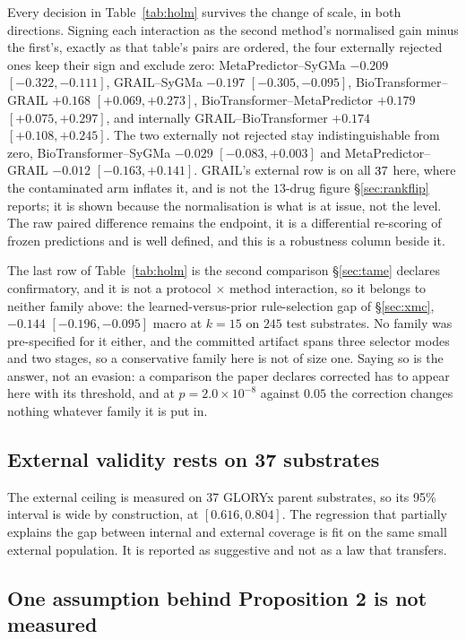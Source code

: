 Every decision in Table~\ref{tab:holm} survives the change of scale, in both directions. Signing each
interaction as the second method's normalised gain minus the first's, exactly as that table's pairs
are ordered, the four externally rejected ones keep their sign and exclude zero:
MetaPredictor--SyGMa $-0.209$ $[-0.322,-0.111]$, GRAIL--SyGMa $-0.197$ $[-0.305,-0.095]$,
BioTransformer--GRAIL $+0.168$ $[+0.069,+0.273]$, BioTransformer--MetaPredictor $+0.179$
$[+0.075,+0.297]$, and internally GRAIL--BioTransformer $+0.174$ $[+0.108,+0.245]$. The two
externally not rejected stay indistinguishable from zero, BioTransformer--SyGMa $-0.029$
$[-0.083,+0.003]$ and MetaPredictor--GRAIL $-0.012$ $[-0.163,+0.141]$. GRAIL's external row
is on all $37$ here, where the contaminated arm inflates it, and is not the $13$-drug figure
\S\ref{sec:rankflip} reports; it is shown because the normalisation is what is at issue, not the
level. The raw paired difference remains the endpoint, it is a differential re-scoring of frozen
predictions and is well defined, and this is a robustness column beside it.

The last row of Table~\ref{tab:holm} is the second comparison \S\ref{sec:tame} declares confirmatory, and it is not a
protocol $\times$ method interaction, so it belongs to neither family above: the learned-versus-prior
rule-selection gap of \S\ref{sec:xmc}, $-0.144$ $[-0.196,-0.095]$ macro at $k=15$ on $245$ test
substrates. No family was pre-specified for it either, and the
committed artifact spans three selector modes and two stages, so a conservative family
here is not of size one. Saying so is the answer, not an evasion: a
comparison the paper declares corrected has to appear here with its threshold, and at
$p=2.0\times10^{-8}$ against $0.05$ the correction changes nothing whatever family it is put in.

\subsection{External validity rests on 37 substrates}

The external ceiling is measured on 37 GLORYx parent substrates, so its 95\% interval is wide by
construction, at $[0.616,0.804]$. The regression that partially explains the gap between internal
and external coverage is fit on the same small external population. It is reported as suggestive and not as a law that transfers.

\subsection{One assumption behind Proposition 2 is not measured}

